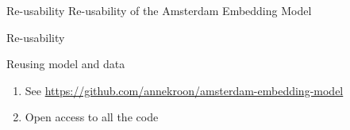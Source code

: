 
\begin{frame}{}
\end{frame}




\begin{frame}{Re-usability}
	Re-usability of the Amsterdam Embedding Model
\end{frame}

\begin{frame}{Re-usability}
  \begin{block}{Reusing model and data}
    \begin{enumerate}
    \item See \url{https://github.com/annekroon/amsterdam-embedding-model}
    \item Open access to all the code
    \end{enumerate}
  \end{block}
\end{frame}



